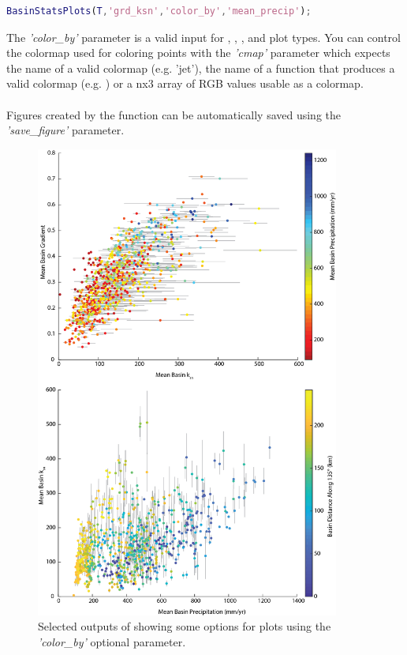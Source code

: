 \begin{lstlisting}[language=Matlab]
% To color a plot of mean gradient vs mean ksn by mean precipitation, and assuming the mean precipitation is stored in a column named 'mean_precip' in the input table, T
BasinStatsPlots(T,'grd_ksn','color_by','mean_precip');
\end{lstlisting}

\noindent
The \textit{'color\_by'} parameter is a valid input for , , , and  plot types. You can control the colormap used for coloring points with the \textit{'cmap'} parameter which expects the name of a valid colormap (e.g. 'jet'), the name of a function that produces a valid colormap (e.g. ) or a nx3 array of RGB values usable as a colormap.

\paragraph{}Figures created by the function can be automatically saved using the \textit{'save\_figure'} parameter. 

\begin{figure}[H]
	\centering
	\includegraphics[width=10cm]{PNGs/BasinStats.png}
	\caption{Selected outputs of  showing some options for plots using the \textit{'color\_by'} optional parameter.}
	\label{fig:BsnSts}
\end{figure}


